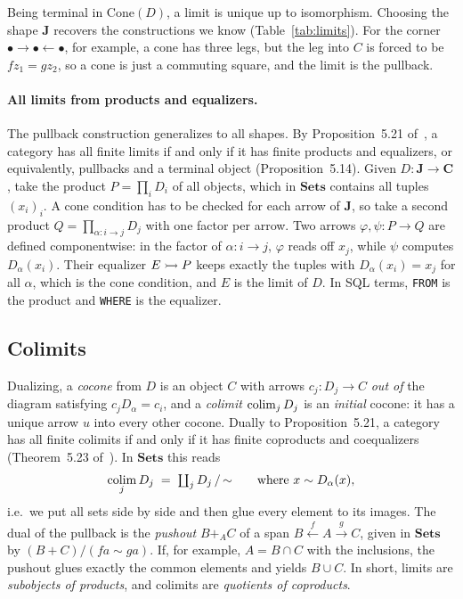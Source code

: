 Being terminal in $\mathrm{Cone}(D)$, a limit is unique up to
isomorphism. Choosing the shape $\mathbf{J}$ recovers the constructions we
know (Table~\ref{tab:limits}). For the corner $\bullet \to \bullet \leftarrow
\bullet$, for example, a cone has three legs, but the leg into $C$ is forced to
be $f z_1 = g z_2$, so a cone is just a commuting square, and the limit is the
pullback.

\paragraph{All limits from products and equalizers.} The pullback
construction generalizes to all shapes. By Proposition~5.21
of~\cite{Awodey10}, a category has all finite limits if and only if it has
finite products and equalizers, or equivalently, pullbacks and a terminal
object (Proposition~5.14). Given $D: \mathbf{J} \to \mathbf{C}$,
take the product $P = \prod_i D_i$ of all objects, which in $\mathbf{Sets}$
contains all tuples $(x_i)_i$. A cone condition has to be checked for each
arrow of $\mathbf{J}$, so take a second product $Q = \prod_{\alpha: i \to
j} D_j$ with one factor per arrow. Two arrows $\varphi, \psi: P \to Q$
are defined componentwise: in the factor of $\alpha: i \to j$, $\varphi$
reads off $x_j$, while $\psi$ computes $D_\alpha(x_i)$. Their equalizer $E
\rightarrowtail P$ keeps exactly the tuples with $D_\alpha(x_i) = x_j$ for all $\alpha$,
which is the cone condition, and $E$ is the limit of $D$. In SQL terms,
\texttt{FROM} is the product and \texttt{WHERE} is the equalizer.

\subsection{Colimits}
\label{sec:colimits}

Dualizing, a \emph{cocone} from $D$ is an object $C$ with arrows $c_j:
D_j \to C$ \emph{out of} the diagram satisfying $c_j D_\alpha = c_i$, and a
\emph{colimit} $\operatorname*{colim}_j D_j$ is an \emph{initial} cocone: it has a unique
arrow $u$ into every other cocone. Dually to Proposition~5.21, a category has
all finite colimits if and only if it has finite coproducts and coequalizers
(Theorem~5.23 of~\cite{Awodey10}). In $\mathbf{Sets}$ this reads
\[
  \operatorname*{colim}_j D_j \;=\; \textstyle\coprod_j D_j \,/\, {\sim}
  \qquad\text{where } x \sim D_\alpha(x),
\]
i.e.\ we put all sets side by side and then glue every element to its images.
The dual of the pullback is the \emph{pushout} $B +_A C$ of a span $B
\xleftarrow{f} A \xrightarrow{g} C$, given in $\mathbf{Sets}$ by $(B + C) /
(f a \sim g a)$. If, for example, $A = B \cap C$ with the inclusions, the
pushout glues exactly the common elements and yields $B \cup C$. In short,
limits are \emph{subobjects of products}, and colimits are \emph{quotients of
coproducts}.

